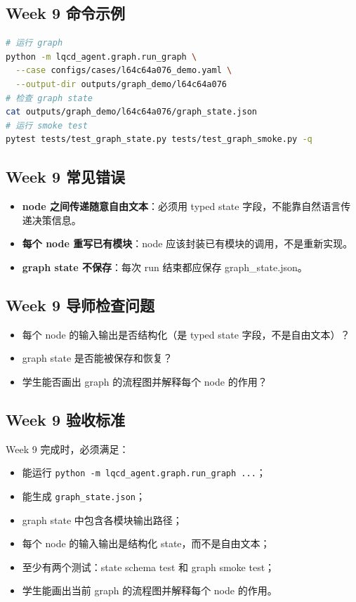 \documentclass[11pt,a4paper,fontset=none]{ctexart}
\begin{document}
\subsection{Week 9 命令示例}
\begin{lstlisting}[language=bash]
# 运行 graph
python -m lqcd_agent.graph.run_graph \
  --case configs/cases/l64c64a076_demo.yaml \
  --output-dir outputs/graph_demo/l64c64a076
# 检查 graph state
cat outputs/graph_demo/l64c64a076/graph_state.json
# 运行 smoke test
pytest tests/test_graph_state.py tests/test_graph_smoke.py -q
\end{lstlisting}

\subsection{Week 9 常见错误}
\begin{itemize}[leftmargin=2em]
  \item \textbf{node 之间传递随意自由文本}：必须用 typed state 字段，不能靠自然语言传递决策信息。
  \item \textbf{每个 node 重写已有模块}：node 应该封装已有模块的调用，不是重新实现。
  \item \textbf{graph state 不保存}：每次 run 结束都应保存 graph\_state.json。
\end{itemize}

\subsection{Week 9 导师检查问题}
\begin{itemize}[leftmargin=2em]
  \item 每个 node 的输入输出是否结构化（是 typed state 字段，不是自由文本）？
  \item graph state 是否能被保存和恢复？
  \item 学生能否画出 graph 的流程图并解释每个 node 的作用？
\end{itemize}

\subsection{Week 9 验收标准}

Week 9 完成时，必须满足：

\begin{itemize}[leftmargin=2em]
  \item 能运行 \texttt{python -m lqcd\_agent.graph.run\_graph ...}；
  \item 能生成 \texttt{graph\_state.json}；
  \item graph state 中包含各模块输出路径；
  \item 每个 node 的输入输出是结构化 state，而不是自由文本；
  \item 至少有两个测试：state schema test 和 graph smoke test；
  \item 学生能画出当前 graph 的流程图并解释每个 node 的作用。
\end{itemize}
\end{document}
